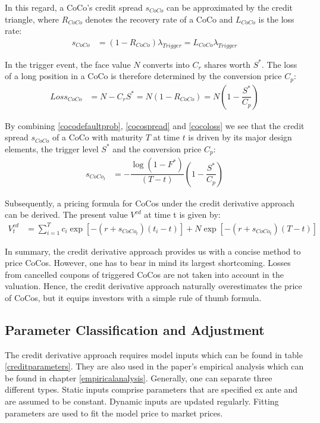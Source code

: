 In this regard, a CoCo's credit spread $s_{CoCo}$ can be approximated by the credit triangle, where $R_{CoCo}$ denotes the recovery rate of a CoCo and $L_{CoCo}$ is the loss rate:
\begin{align} \label{cocospread}
    s_{CoCo} &= \left(1 - R_{CoCo}\right) \lambda_{Trigger} = {L}_{CoCo} \lambda_{Trigger}
\end{align}

In the trigger event, the face value $N$ converts into $C_r$ shares worth $S^*$. The loss of a long position in a CoCo is therefore determined by the conversion price $C_p$:
\begin{align} \label{cocoloss}
    {Loss}_{CoCo} &= N - C_r S^* = N \left(1 - R_{CoCo} \right) = N \left(1 - \dfrac{S^*}{C_p} \right)
\end{align} 

By combining \ref{cocodefaultprob}, \ref{cocospread} and \ref{cocoloss} we see that the credit spread $s_{CoCo}$ of a CoCo with maturity $T$ at time $t$ is driven by its major design elements, the trigger level $S^*$ and the conversion price $C_p$:
\begin{align}
s_{CoCo_t}&= - \dfrac{\log (1 - F^*)}{(T - t)} \left( 1 - \dfrac{S^*}{C_p} \right)
\end{align}

Subsequently, a pricing formula for CoCos under the credit derivative approach can be derived. The present value $V^{cd}$ at time t is given by:
\begin{align}
V^{cd}_t &= \sum^T_{i=1} c_i \exp\left[-(r + s_{CoCo_t}) (t_i - t)\right] + N \exp\left[-(r+s_{CoCo_t}) (T-t) \right]
\end{align}

In summary, the credit derivative approach provides us with a concise method to price CoCos. However, one has to bear in mind its largest shortcoming. Losses from cancelled coupons of triggered CoCos are not taken into account in the valuation. Hence, the credit derivative approach naturally overestimates the price of CoCos, but it equips investors with a simple rule of thumb formula. 

\subsection{Parameter Classification and Adjustment}
The credit derivative approach requires model inputs which can be found in table \ref{creditparameters}. They are also used in the paper's empirical analysis which can be found in chapter \ref{empiricalanalysis}. Generally, one can separate three different types. Static inputs comprise parameters that are specified ex ante and are assumed to be constant. Dynamic inputs are updated regularly. Fitting parameters are used to fit the model price to market prices. \citep{wilkens2014contingent}

